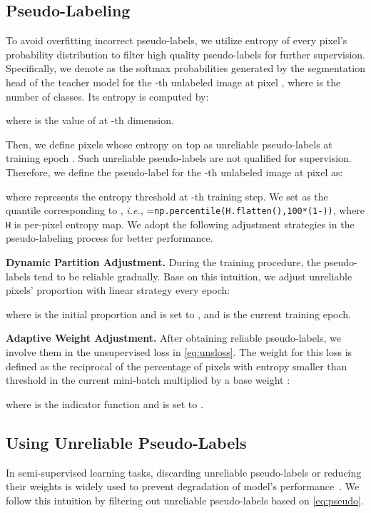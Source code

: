 \documentclass[10pt, twocolumn, letterpaper]{article}
\begin{document}
\subsection{Pseudo-Labeling}
\label{sec:pseudo}
To avoid overfitting incorrect pseudo-labels, we utilize entropy of every pixel's probability distribution to filter high quality pseudo-labels for further supervision.
Specifically, we denote  as the softmax probabilities generated by the segmentation head of the teacher model for the -th unlabeled image at pixel , where  is the number of classes.
Its entropy is computed by:

where  is the value of  at -th dimension.


Then, we define pixels whose entropy on top  as unreliable pseudo-labels at training epoch . 
Such unreliable pseudo-labels are not qualified for supervision.
Therefore, we define the pseudo-label for the -th unlabeled image at pixel  as:

where  represents the entropy threshold at -th training step. 
We set  as the quantile corresponding to , \textit{i.e.}, =\texttt{np.percentile(H.flatten(),100*(1-))}, where \texttt{H} is per-pixel entropy map.
We adopt the following adjustment strategies in the pseudo-labeling process for better performance.


\noindent \textbf{Dynamic Partition Adjustment.} During the training procedure, the pseudo-labels tend to be reliable gradually.
Base on this intuition, we adjust unreliable pixels' proportion  with linear strategy every epoch:

where  is the initial proportion and is set to , and  is the current training epoch. 


\noindent \textbf{Adaptive Weight Adjustment.} After obtaining reliable pseudo-labels, we involve them in the unsupervised loss in \cref{eq:unsloss}. 
The weight  for this loss is defined as the reciprocal of the percentage of pixels with entropy smaller than threshold  in the current mini-batch multiplied by a base weight :

where  is the indicator function and  is set to .





\subsection{Using Unreliable Pseudo-Labels}
\label{sec:unreliable}


In semi-supervised learning tasks, discarding unreliable pseudo-labels or reducing their weights is widely used to prevent degradation of model's performance~\cite{pseudoseg, st++, fixmatch, xie2020self}. 
We follow this intuition by filtering out unreliable pseudo-labels based on \cref{eq:pseudo}.
\end{document}
